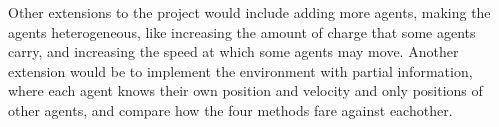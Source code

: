 \documentclass{article}
\begin{document}
Other extensions to the project would include adding more agents, making the agents heterogeneous,
like increasing the amount of charge that some agents carry, and increasing the speed at which
some agents may move. Another extension would be to implement the environment with partial
information, where each agent knows their own position and velocity and only positions of other
agents, and compare how the four methods fare against eachother.









\end{document}
